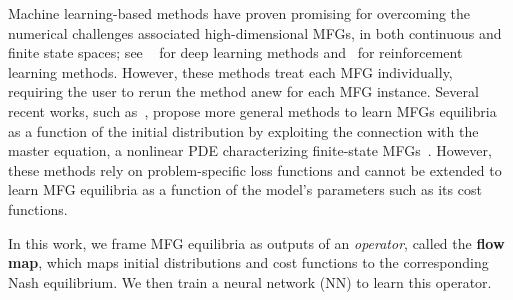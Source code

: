 \documentclass[11pt,reqno]{amsart}
\numberwithin{equation}{section}
\theoremstyle{plain}
\newcommand{\1}{\boldsymbol{\mathbbm{1}}}
\begin{document}
Machine learning-based methods have proven promising for overcoming the numerical challenges associated high-dimensional MFGs, in both continuous and finite state spaces; see ~\cite{fouque2020deep, carmona2021convergence, carmona2022convergence,min2021signatured,han2024learning} for deep learning methods and~\cite{guo2019learningMFG,subramanian2019reinforcementMFG,elie2020convergence,cui2021approximately} for reinforcement learning methods. However, these methods treat each MFG individually, requiring the user to rerun the method anew for each MFG instance. Several recent works, such as~\cite{coh-lau-zel2025}, propose more general methods to learn MFGs equilibria as a function of the initial distribution by exploiting the connection with the master equation, a nonlinear PDE characterizing finite-state MFGs~\citep{CardaliaguetDelarueLasryLions}. However, these methods rely on problem-specific loss functions and cannot be extended to learn MFG equilibria as a function of the model's parameters such as its cost functions.

In this work, we frame MFG equilibria as outputs of an \emph{operator}, called the \textbf{flow map}, which maps initial distributions and cost functions to the corresponding Nash equilibrium. We then train a neural network (NN) to learn this operator.
\end{document}
